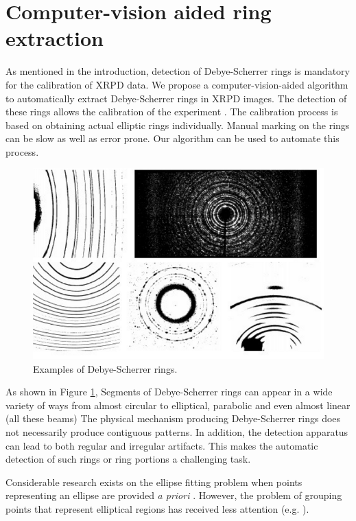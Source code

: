 \documentclass[preprint]{iucr}              %
\newcommand\dsrs{Debye-Scherrer rings}
\begin{document}
\section{Computer-vision aided ring extraction}
As mentioned in the introduction, detection of {\dsrs} is mandatory for the
calibration of XRPD data. 
We propose a computer-vision-aided algorithm to automatically extract {\dsrs} in
XRPD images. 
The detection of these rings allows the calibration of the experiment
\cite{pyFAI_2015}. 
The calibration process is based on obtaining actual elliptic rings
individually. 
Manual marking on the rings can be slow as well as error prone. 
Our algorithm can be used to automate this process.


\begin{figure}
\centering

\includegraphics[width=.85\linewidth]{Figures/dsrs_example.png}

\label{fig:examples}
\caption{
Examples of \dsrs{}.}
\end{figure}

As shown in Figure \ref{fig:examples}, Segments of Debye-Scherrer rings can
appear in a wide variety of ways from almost circular to elliptical, parabolic
and even almost linear (all these beams) The physical mechanism producing
{\dsrs} does not necessarily produce contiguous patterns.   
In addition, the detection apparatus can lead to both regular and irregular artifacts. 
This makes the automatic detection of such rings or ring portions a challenging task.

Considerable research exists on the ellipse fitting problem when points
representing an ellipse are provided \textit{a priori}
\cite{gander1996least,fitzgibbon1999direct,kanatani2008compact}. However, the
problem of grouping points that represent elliptical regions has received less
attention (e.g. 
\cite{qiao2007arc,chia2011split,wong2012survey,puatruaucean12A}).     
\end{document}
